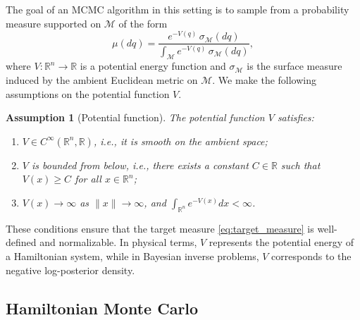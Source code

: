 \documentclass[12pt]{article}
\newtheorem{assumption}{Assumption}[section]
\begin{document}
The goal of an MCMC algorithm in this setting is to sample from a probability measure supported on $\mathcal{M}$ of the form
\begin{equation}\label{eq:target_measure}
\mu(dq) 
= \frac{e^{-V(q)} \, \sigma_{\mathcal{M}}(dq)}{\int_{\mathcal{M}} e^{-V(q)} \, \sigma_{\mathcal{M}}(dq)},
\end{equation}
where $V : \mathbb{R}^n \to \mathbb{R}$ is a potential energy function and $\sigma_{\mathcal{M}}$ is the surface measure induced by the ambient Euclidean metric on $\mathcal{M}$.
We make the following assumptions on the potential function $V$.
\begin{assumption}[Potential function]\label{ass:potential}
The potential function $V$ satisfies:
\begin{enumerate}
    \item[(i)] $V \in C^\infty(\mathbb{R}^n,\mathbb R)$, i.e., it is smooth on the ambient space;
    \item[(ii)] $V$ is bounded from below, i.e., there exists a constant $C \in \mathbb{R}$ such that $V(x) \ge C$ for all $x \in \mathbb{R}^n$;
    \item[(iii)] $V(x) \to \infty$ as $\|x\| \to \infty$, and $\int_{\mathbb{R}^n} e^{-V(x)} dx < \infty$.
\end{enumerate}
\end{assumption}
These conditions ensure that the target measure \eqref{eq:target_measure} is well-defined and normalizable. In physical terms, $V$ represents the potential energy of a Hamiltonian system, while in Bayesian inverse problems, $V$ corresponds to the negative log-posterior density.


\subsection{Hamiltonian Monte Carlo}\label{sec3.1}
\end{document}
